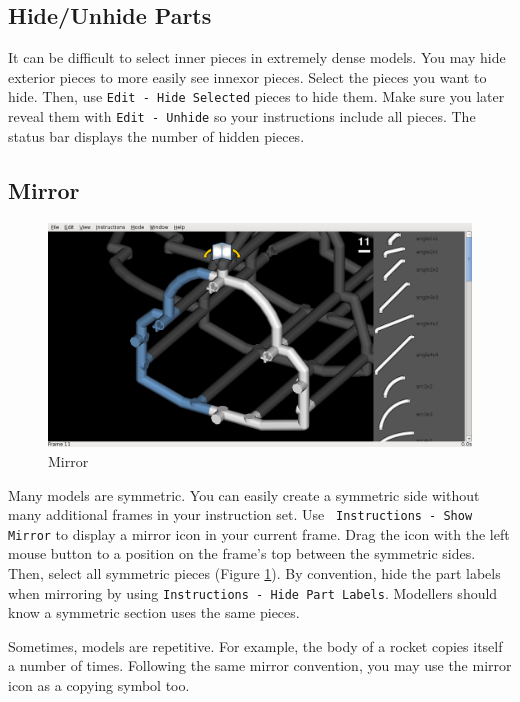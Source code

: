 \documentclass[12pt]{report}
\begin{document}
\subsection{Hide/Unhide Parts}

It can be difficult to select inner pieces in extremely dense models.
You may hide exterior pieces to more easily see innexor pieces.
Select the pieces you want to hide.  Then, use {\tt Edit - Hide
  Selected} pieces to hide them.  Make sure you later reveal them with
{\tt Edit - Unhide} so your instructions include all pieces.  The
status bar displays the number of hidden pieces.

\subsection{Mirror}

\begin{figure}[H]
\begin{center}
\includegraphics[width=5.38in]{doc_images/manual_instructions_mirror.png}
\caption{Mirror}
\label{InstructionsMirror}
\end{center}
\end{figure}

Many models are symmetric.  You can easily create a symmetric side
without many additional frames in your instruction set.  Use {\tt
  Instructions - Show Mirror} to display a mirror icon in your current
frame.  Drag the icon with the left mouse button to a position on the
frame's top between the symmetric sides.  Then, select all symmetric
pieces (Figure \ref{InstructionsMirror}).  By convention, hide the
part labels when mirroring by using {\tt Instructions - Hide Part
  Labels}.  Modellers should know a symmetric section uses the same
pieces.

Sometimes, models are repetitive.  For example, the body of a rocket
copies itself a number of times.  Following the same mirror
convention, you may use the mirror icon as a copying symbol too.
\end{document}
